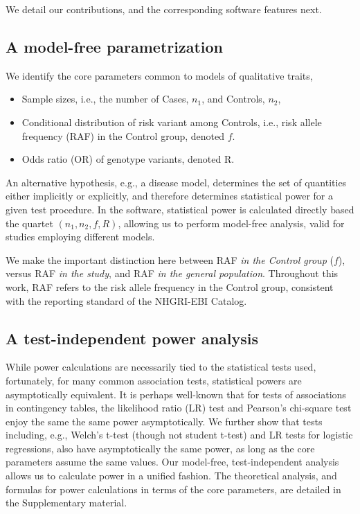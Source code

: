 
We detail our contributions, and the corresponding software features next.

\vspace{-5pt}
\subsection{A model-free parametrization}

We identify the core parameters common to models of qualitative traits,
\begin{itemize}
    \item Sample sizes, i.e., the number of Cases, $n_1$, and Controls, $n_2$,
    \item Conditional distribution of risk variant among Controls, i.e., risk allele frequency (RAF) in the Control group, denoted $f$.
    \item Odds ratio (OR) of genotype variants, denoted $\text{R}$.
\end{itemize}
An alternative hypothesis, e.g., a disease model, determines the set of quantities either implicitly or explicitly,
and therefore determines statistical power for a given test procedure.
In the software, statistical power is calculated directly based the quartet $(n_1, n_2, f, R)$, allowing us to perform model-free analysis, valid for studies employing different models.

We make the important distinction here between RAF \emph{in the Control group} ($f$), versus RAF \emph{in the study}, and RAF \emph{in the general population}.
Throughout this work, RAF refers to the risk allele frequency in the Control group, consistent with the reporting standard of the NHGRI-EBI Catalog.

\vspace{-5pt}
\subsection{A test-independent power analysis}

While power calculations are necessarily tied to the statistical tests used, fortunately, for many common association tests, statistical powers are asymptotically equivalent.
It is perhaps well-known that for tests of associations in contingency tables, the likelihood ratio (LR) test and Pearson's chi-square test enjoy the same the same power asymptotically.
We further show that tests including, e.g., Welch's t-test (though not student t-test) and LR tests for logistic regressions, also have asymptotically the same power, as long as the core parameters assume the same values.
Our model-free, test-independent analysis allows us to calculate power in a unified fashion. 
The theoretical analysis, and formulas for power calculations in terms of the core parameters, are detailed in the Supplementary material.

